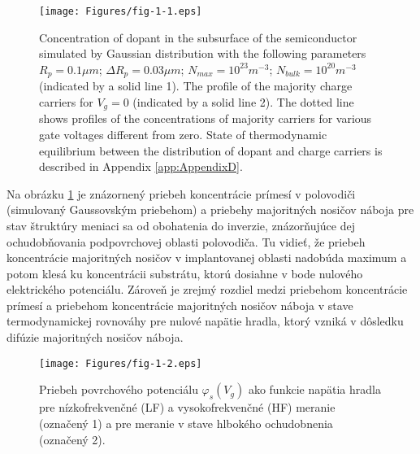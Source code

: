\begin{figure}[h!]\centering
\texttt{[image: Figures/fig-1-1.eps]}
\captionsetup{justification=raggedright, singlelinecheck=false}
\iffalse
\caption[Priebeh koncentrácie prímesí v podpovrchovej oblasti
  polovodiča]{Priebeh koncentrácie prímesí v podpovrchovej oblasti
  polovodiča simulovaný Gaussovským rozložením \cite{1.11} s
  následovnými parametrami $R_p=0.1 \mu{m}$; $\Delta{R_p}=0.03
  \mu{m}$; $N_{max}=10^{23} m^{-3}$; $N_{bulk}=10^{20} m^{-3}$
  (označený plnou čiarou 1). Priebeh majoritných nosičov náboja pre
  $V_g=0$ (označený plnou čiarou 2). Bodkovanými čiarami sú znázornené
  priebehy koncentrácií majoritných nosičov pre napätia hradla rôzne
  od nuly. Stav termodynamickej rovnováhy medzi rozložením prímesí a
  nosičov náboja je popísaný v dodatku \ref{app:AppendixD}.}
\fi
\caption[Concentration of dopant in the subsurface of the
  semiconductor] {Concentration of dopant in the subsurface of the
  semiconductor simulated by Gaussian distribution \cite{1.11} with
  the following parameters $R_p=0.1 \mu{m}$; $\Delta{R_p}=0.03\mu{m}$;
  $N_{max}=10^{23} m^{-3}$; $N_{bulk}=10^{20} m^{-3}$ (indicated by a
  solid line 1). The profile of the majority charge carriers for
  $V_g=0$ (indicated by a solid line 2). The dotted line shows
  profiles of the concentrations of majority carriers for various gate
  voltages different from zero. State of thermodynamic equilibrium
  between the distribution of dopant and charge carriers is described
  in Appendix \ref{app:AppendixD}.}
\label{fig:1.1}
\end{figure}

\par Na obrázku \ref{fig:1.1} je znázornený priebeh koncentrácie
prímesí v polovodiči (simulovaný Gaussovským priebehom) a priebehy
majoritných nosičov náboja pre stav štruktúry meniaci sa od obohatenia
do inverzie, znázorňujúce dej ochudobňovania podpovrchovej oblasti
polovodiča. Tu vidieť, že priebeh koncentrácie majoritných nosičov v
implantovanej oblasti nadobúda maximum a potom klesá ku koncentrácii
substrátu, ktorú dosiahne v bode nulového elektrického potenciálu.
Zároveň je zrejmý rozdiel medzi priebehom koncentrácie prímesí a
priebehom koncentrácie majoritných nosičov náboja v stave
termodynamickej rovnováhy pre nulové napätie hradla, ktorý vzniká v
dôsledku difúzie majoritných nosičov náboja.

\begin{figure}[h!]\centering
\texttt{[image: Figures/fig-1-2.eps]}
\captionsetup{justification=raggedright, singlelinecheck=false}
\caption[Priebeh povrchového potenciálu $\varphi_s(V_g)$ ako funkcie
  napätia hradla]{Priebeh povrchového potenciálu $\varphi_s(V_g)$ ako
  funkcie napätia hradla pre nízkofrekvenčné (LF) a vysokofrekvenčné
  (HF) meranie (označený 1) a pre meranie v stave hlbokého
  ochudobnenia (označený 2).}
\label{fig:1.2}
\end{figure}

